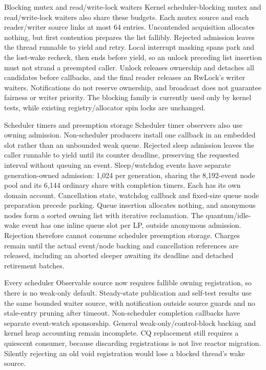 \begin{implementationdetail}{Blocking mutex and read/write-lock waiters}
Kernel scheduler-blocking mutex and read/write-lock waiters also share these
budgets. Each mutex source and each reader/writer source links at most 64 entries.
Uncontended acquisition allocates nothing, but first contention prepares the list
fallibly. Rejected admission leaves the thread runnable to yield and retry.
Local interrupt masking spans park and the lost-wake recheck, then ends before
yield, so an unlock preceding list insertion must not strand a preempted caller.
Unlock releases ownership and detaches all candidates before callbacks, and the
final reader releases an RwLock's writer waiters. Notifications do not reserve
ownership, and broadcast does not guarantee fairness or writer priority.
The blocking family is currently used only by kernel tests, while
existing registry/allocator spin locks are unchanged.
\end{implementationdetail}

\begin{implementationdetail}{Scheduler timers and preemption storage}
Scheduler timer observers also use owning admission. Non-scheduler producers
install one callback in an embedded slot rather than an unbounded weak queue.
Rejected sleep admission leaves the caller runnable to yield until its counter
deadline, preserving the requested interval without queuing an event.
Sleep/watchdog events have separate generation-owned admission: 1,024 per
generation, sharing the 8,192-event node pool and its 6,144 ordinary share with
completion timers. Each has its own domain account. Cancellation state,
watchdog callback and fixed-size queue
node preparation precede parking. Queue insertion allocates nothing, and anonymous
nodes form a sorted owning list with iterative reclamation. The quantum/idle-wake
event has one inline queue slot per LP, outside anonymous admission. Rejection
therefore cannot consume scheduler preemption storage. Charges remain until the
actual event/node backing and cancellation references are released, including
an aborted sleeper awaiting its deadline and detached retirement batches.
\end{implementationdetail}

Every scheduler Observable source now requires fallible owning registration, so
there is no weak-only default. Steady-state publication and self-test results
use the same bounded waiter source, with notification outside source guards and
no stale-entry pruning after timeout. Non-scheduler completion callbacks have
separate event-watch sponsorship. General weak-only/control-block backing and kernel
heap accounting remain incomplete. CQ replacement still requires a quiescent
consumer, because discarding registrations is not live reactor migration. Silently
rejecting an old void registration would lose a blocked thread's wake source.

